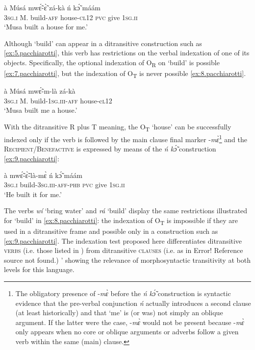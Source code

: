 \documentclass[output=paper]{langsci/langscibook}
\begin{document}
\ea
\label{ex:6.pacchiarotti}
\gll \`{a}    M\'{u}s\'{a}  mwɛ̃́-ɛ̃̀    z\'{a}-k\`{a}    \'{n}  kɔ̃́  m\'{a}\'{a}m \\
\textsc{3sg.i  }  M.  build-\textsc{aff}  house\textsc{-cl12}  \textsc{pvc}  give  \textsc{1sg.ii}\\
\glt`Musa built a house for me.'
\z

Although `build' can appear in a ditransitive construction such as \ref{ex:5.pacchiarotti}, this verb has restrictions on the verbal indexation of one of its objects. Specifically, the optional indexation of O\textsubscript{R} on `build' is possible \ref{ex:7.pacchiarotti}, but the indexation of O\textsubscript{T} is never possible \ref{ex:8.pacchiarotti}.

\ea
\label{ex:7.pacchiarotti}
\gll \`{a}    M\'{u}s\'{a}  mwɛ̃́-m-l\`{a}    z\'{a}-k\`{a}\\
\textsc{3sg.i  }  M.  build-\textsc{1sg.iii-aff}  house-c\textsc{l12}\\
\glt `Musa built me a house.'
\z
 
\z


With the ditransitive R plus T meaning, the O\textsubscript{T} `house' can be successfully indexed only if the verb is followed by the main clause final marker -\textit{m\`{ɛ}}\footnote{The obligatory presence of -\textit{m\`{ɛ}} before the \textit{\'{n} k\'{\~{ɔ}}} construction is syntactic evidence that the pre-verbal conjunction \textit{\'{n} }actually introduces a second clause (at least historically) and that `me' is (or was) not simply an oblique argument. If the latter were the case, -\textit{m\`{ɛ}} would not be present because -\textit{m\`{ɛ}} only appears when no core or oblique arguments or adverbs follow a given verb within the same (main) clause.}{ }and the \textsc{Recipient/Benefactive} is expressed by means of the \textit{\'{n} k\'{\~{ɔ}}} construction \ref{ex:9.pacchiarotti}:

\ea
\label{ex:9.pacchiarotti}
\gll \`{a}    mwɛ̃́-ɛ̃̀-là-mɛ̀      \'{n}  kɔ̃́  m\'{a}\'{a}m \\
\textsc{3sg.i  }  build-\textsc{3sg.iii-aff-phb}  \textsc{pvc}  give\textsc{  1sg.ii} \\
\glt `He built it for me.'
\z

The verbs \textit{w\'{i}} `bring water' and \textit{r\'{a}} `build' display the same restrictions illustrated for `build' in \ref{ex:8.pacchiarotti}: the indexation of O\textsubscript{T} is impossible if they are used in a ditransitive frame and possible only in a construction such as \ref{ex:9.pacchiarotti}. The indexation test proposed here differentiates ditransitive \textsc{verbs} (i.e. those listed in ) from ditransitive \textsc{clauses} (i.e. as in Error! Reference source not found.) ' showing the relevance of morphosyntactic transitivity at both levels for this language.
\end{document}
